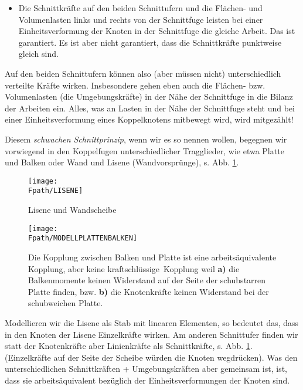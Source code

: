 \begin{itemize}
\item Die Schnittkr\"{a}fte
auf den beiden Schnittufern und die Fl\"{a}chen- und Volumenlasten links und rechts von der Schnittfuge leisten bei einer Einheitsverformung der Knoten in der Schnittfuge die gleiche Arbeit. Das ist garantiert. Es ist aber nicht garantiert, dass die Schnittkr\"{a}fte punktweise gleich sind.
\end{itemize}
Auf den beiden Schnittufern k\"{o}nnen also (aber m\"{u}ssen nicht) unterschiedlich verteilte Kr\"{a}fte wirken. Insbesondere gehen eben auch die Fl\"{a}chen- bzw. Volumenlasten (die \glq Umgebungskr\"{a}fte\grq) in der N\"{a}he der Schnittfuge in die Bilanz der Arbeiten ein. Alles, was an Lasten in der N\"{a}he der Schnittfuge steht und bei einer Einheitsverformung eines Koppelknotens mitbewegt wird, wird mitgez\"{a}hlt!

Diesem {\em schwachen Schnittprinzip\/}, wenn wir es so nennen wollen, begegnen wir vorwiegend in den Koppelfugen unterschiedlicher Tragglieder, wie etwa Platte und Balken oder Wand und Lisene (Wandvorspr\"{u}nge), s. Abb. \ref{Lisene}.
\begin{figure}[tbp] \centering
\if {} \sidecaption \fi
\texttt{[image: \\Fpath/LISENE]}
\caption{Lisene und Wandscheibe} \label{Lisene}
\end{figure}%
\begin{figure}[tbp] \centering
\if {} \sidecaption \fi
\texttt{[image: \\Fpath/MODELLPLATTENBALKEN]}
\caption{Die Kopplung zwischen Balken und Platte ist eine arbeits\"{a}quivalente Kopplung,
aber keine \glq kraftschl\"{u}ssige\grq\ Kopplung weil {\bf a)} die Balkenmomente keinen
Widerstand auf der Seite der schubstarren Platte finden, bzw. {\bf b)} die Knotenkr\"{a}fte
keinen Widerstand bei der schubweichen Platte.} \label{Modellplattenbalken}
\end{figure}%

Modellieren wir die Lisene als Stab mit linearen Elementen, so bedeutet das, dass in den Knoten der Lisene Einzelkr\"{a}fte wirken. Am anderen Schnittufer finden wir statt der Knotenkr\"{a}fte aber Linienkr\"{a}fte als Schnittkr\"{a}fte, s. Abb. \ref{Lisene}. (Einzelkr\"{a}fte auf der Seite der Scheibe w\"{u}rden die Knoten wegdr\"{u}cken). Was den unterschiedlichen Schnittkr\"{a}ften + Umgebungskr\"{a}ften aber gemeinsam ist, ist, dass sie arbeits\"{a}quivalent bez\"{u}glich der Einheitsverformungen der Knoten sind.

